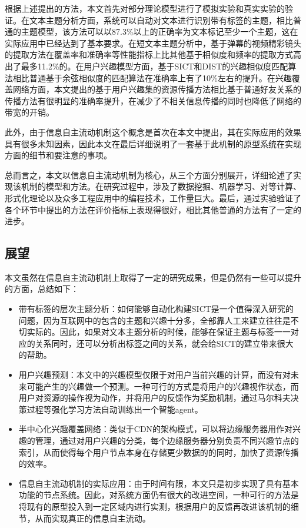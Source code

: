 根据上述提出的方法，本文首先对部分理论模型进行了模拟实验和真实实验的验证。在文本主题分析方面，系统可以自动对文本进行识别带有标签的主题，相比普通的主题模型，该方法可以以87.3\%以上的正确率为文本标记至少一个主题，这在实际应用中已经达到了基本要求。在短文本主题分析中，基于弹幕的视频精彩镜头的提取方法在覆盖率和准确率等性能指标上比其他基于相似度和频率的提取方式高出了最多11.2\%的。在用户兴趣模型方面，基于SICT和DIST的兴趣相似度匹配算法相比普通基于余弦相似度的匹配算法在准确率上有了10\%左右的提升。在兴趣覆盖网络方面，本文提出的基于用户兴趣集的资源传播方法相比基于普通好友关系的传播方法有很明显的准确率提升，在减少了不相关信息传播的同时也降低了网络的带宽的开销。

此外，由于信息自主流动机制这个概念是首次在本文中提出，其在实际应用的效果具有很多未知因素，因此本文在最后详细说明了一套基于此机制的原型系统在实现方面的细节和要注意的事项。

总而言之，本文以信息自主流动机制为核心，从三个方面分别展开，详细论述了实现该机制的模型和方法。在研究过程中，涉及了数据挖掘、机器学习、对等计算、形式化理论以及众多工程应用中的编程技术，工作量巨大。最后，通过实验验证了各个环节中提出的方法在评价指标上表现得很好，相比其他普通的方法有了一定的进步。

\subsection{展望}
本文虽然在信息自主流动机制上取得了一定的研究成果，但是仍然有一些可以提升的方面，总结如下：
\begin{itemize}
  \item 带有标签的层次主题分析：如何能够自动化构建SICT是一个值得深入研究的问题，因为互联网中的包含的主题和兴趣十分多，全部靠人工来建立往往是不切实际的。因此，如果对文本主题分析的时候，能够在保证主题与标签一一对应的关系同时，还可以分析出标签之间的关系，就会给SICT的建立带来很大的帮助。
  \item 用户兴趣预测：本文中的兴趣模型仅限于对用户当前兴趣的计算，而没有对未来可能产生的兴趣做一个预测。一种可行的方式是将用户的兴趣视作状态，而用户对资源的操作视为动作，并将用户的反馈作为奖励机制，通过马尔科夫决策过程等强化学习方法自动训练出一个智能agent。
  \item 半中心化兴趣覆盖网络：类似于CDN的架构模式，可以将边缘服务器用作对兴趣的管理，通过对用户兴趣的分类，每个边缘服务器分别负责不同兴趣节点的索引，从而使得每个用户节点本身在存储更少数据的的同时，加快了资源传播的效率。
  \item 信息自主流动机制的实际应用：由于时间有限，本文只是初步实现了具有基本功能的节点系统。因此，对系统方面仍有很大的改进空间，一种可行的方法是将现有的原型投入到一定区域内进行实测，根据用户的反馈再改进该机制的细节，从而实现真正的信息自主流动。
\end{itemize}
